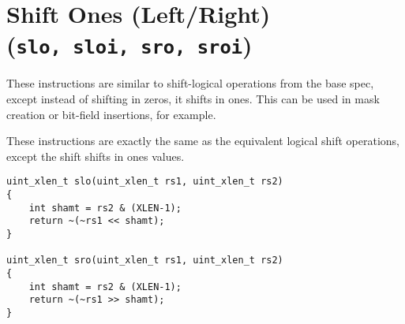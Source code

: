 %
%
%
%
%
%
%
%
%


\section{Shift Ones (Left/Right) (\texttt{slo,\ sloi,\ sro,\ sroi})}

These instructions are similar to shift-logical operations from the base
spec, except instead of shifting in zeros, it shifts in ones. This can
be used in mask creation or bit-field insertions, for example.

These instructions are exactly the same as the equivalent logical shift
operations, except the shift shifts in ones values.

\begin{verbatim}
uint_xlen_t slo(uint_xlen_t rs1, uint_xlen_t rs2)
{
    int shamt = rs2 & (XLEN-1);
    return ~(~rs1 << shamt);
}

uint_xlen_t sro(uint_xlen_t rs1, uint_xlen_t rs2)
{
    int shamt = rs2 & (XLEN-1);
    return ~(~rs1 >> shamt);
}
\end{verbatim}

